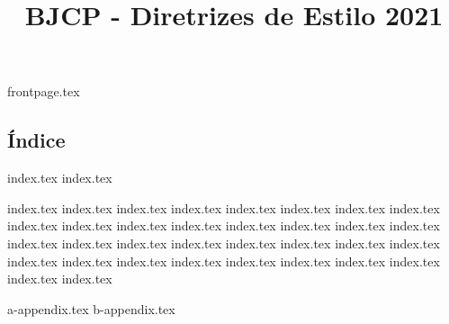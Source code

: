 \documentclass[a4paper, 9t]{article}
\title{BJCP - Diretrizes de Estilo 2021}
\begin{document}
{frontpage.tex}
\begin{multicols}{2}
\section*{Índice}
\tableofcontents
\end{multicols}

{index.tex}
{index.tex}

{index.tex}
{index.tex}
{index.tex}
{index.tex}
{index.tex}
{index.tex}
{index.tex}
{index.tex}
{index.tex}
{index.tex}
{index.tex}
{index.tex}
{index.tex}
{index.tex}
{index.tex}
{index.tex}
{index.tex}
{index.tex}
{index.tex}
{index.tex}
{index.tex}
{index.tex}
{index.tex}
{index.tex}
{index.tex}
{index.tex}
{index.tex}
{index.tex}
{index.tex}
{index.tex}
{index.tex}
{index.tex}
{index.tex}
{index.tex}

{a-appendix.tex}
{b-appendix.tex}
\end{document}
